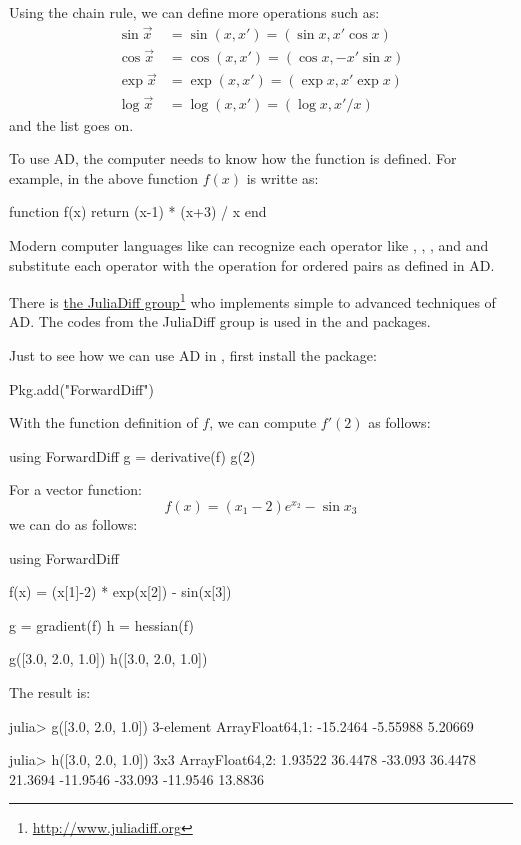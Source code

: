 Using the chain rule, we can define more operations such as:
\begin{align*}
\sin \vec{x} &= \sin(x,x') = (\sin x, x' \cos x) \\
\cos \vec{x} &= \cos(x,x') = (\cos x, - x' \sin x) \\
\exp \vec{x} &= \exp(x,x') = (\exp x, x' \exp x) \\
\log \vec{x} &= \log(x,x') = (\log x, x' / x)
\end{align*}
and the list goes on.

To use AD, the computer needs to know how the function is defined. For example, in \julia{} the above function $f(x)$ is writte as:
\begin{code}
function f(x)
	return (x-1) * (x+3) / x
end
\end{code}
\noindent Modern computer languages like \julia{} can recognize each operator like \kode{-}, \kode{+}, \kode{*}, and \kode{/} and substitute each operator with the operation for ordered pairs as defined in AD.

There is \href{http://www.juliadiff.org}{the JuliaDiff group}\footnote{\url{http://www.juliadiff.org}} who implements simple to advanced techniques of AD. The codes from the JuliaDiff group is used in the  and \jump{} packages.

Just to see how we can use AD in \julia{}, first install the  package:
\begin{code}
Pkg.add("ForwardDiff")
\end{code}
\noindent With the function definition of $f$, we can compute $f'(2)$ as follows:
\begin{code}
using ForwardDiff
g = derivative(f)
g(2)
\end{code}
\noindent For a vector function:
\[
	f(x) = (x_1-2) e^{x_2} - \sin x_3
\]
\noindent we can do as follows:
\begin{code}
using ForwardDiff

f(x) = (x[1]-2) * exp(x[2]) - sin(x[3])

g = gradient(f)
h = hessian(f)

g([3.0, 2.0, 1.0])
h([3.0, 2.0, 1.0])
\end{code}
\noindent The result is:
\begin{code}
julia> g([3.0, 2.0, 1.0])
3-element Array{Float64,1}:
 -15.2464
  -5.55988
   5.20669

julia> h([3.0, 2.0, 1.0])
3x3 Array{Float64,2}:
   1.93522   36.4478  -33.093
  36.4478    21.3694  -11.9546
 -33.093    -11.9546   13.8836
\end{code}


